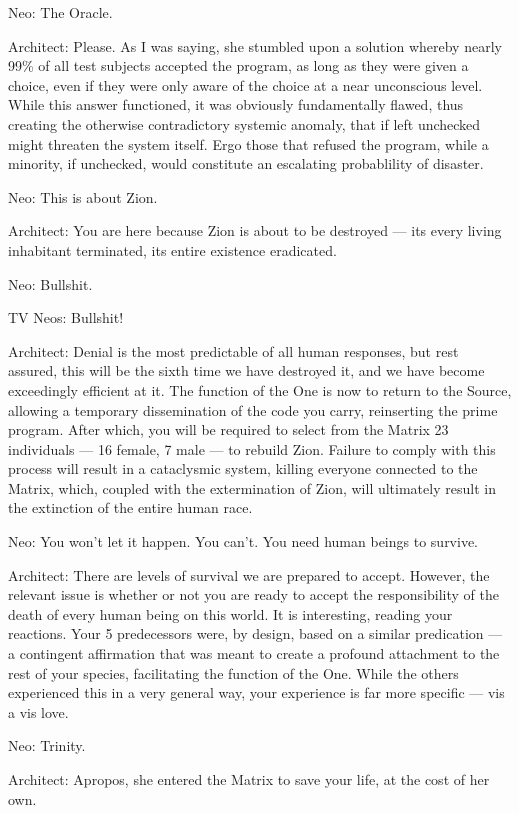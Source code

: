 \documentclass{ctexart}
\newenvironment{myquote}{\color{green} \setlength{\leftskip}{6em} \setlength{\rightskip}{4em} \setlength{\parindent}{-2em}}{\par}
\begin{document}
\begin{myquote}
Neo: The Oracle.

Architect: Please. As I was saying, she stumbled upon a solution whereby nearly 99\% of all test subjects accepted the program, as long as they were given a choice, even if they were only aware of the choice at a near unconscious level. While this answer functioned, it was obviously fundamentally flawed, thus creating the otherwise contradictory systemic anomaly, that if left unchecked might threaten the system itself. Ergo those that refused the program, while a minority, if unchecked, would constitute an escalating probablility of disaster.

Neo: This is about Zion.

Architect: You are here because Zion is about to be destroyed --- its every living inhabitant terminated, its entire existence eradicated.

Neo: Bullshit.

TV Neos: Bullshit!

Architect: Denial is the most predictable of all human responses, but rest assured, this will be the sixth time we have destroyed it, and we have become exceedingly efficient at it. The function of the One is now to return to the Source, allowing a temporary dissemination of the code you carry, reinserting the prime program. After which, you will be required to select from the Matrix 23 individuals --- 16 female, 7 male --- to rebuild Zion. Failure to comply with this process will result in a cataclysmic system, killing everyone connected to the Matrix, which, coupled with the extermination of Zion, will ultimately result in the extinction of the entire human race.

Neo: You won't let it happen. You can't. You need human beings to survive.

Architect: There are levels of survival we are prepared to accept. However, the relevant issue is whether or not you are ready to accept the responsibility of the death of every human being on this world. It is interesting, reading your reactions. Your 5 predecessors were, by design, based on a similar predication --- a contingent affirmation that was meant to create a profound attachment to the rest of your species, facilitating the function of the One. While the others experienced this in a very general way, your experience is far more specific --- vis a vis love.

Neo: Trinity.

Architect: Apropos, she entered the Matrix to save your life, at the cost of her own.


\end{myquote}
\end{document}
